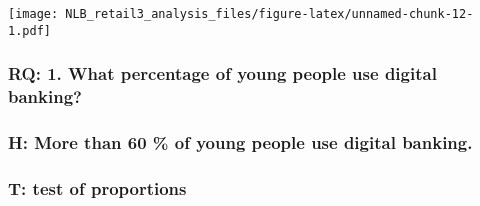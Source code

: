 \documentclass[
]{article}
\newenvironment{Shaded}{\begin{snugshade}}{\end{snugshade}}
\newcommand{\CommentTok}[1]{\textcolor[rgb]{0.56,0.35,0.01}{\textit{#1}}}
\newcommand{\ControlFlowTok}[1]{\textcolor[rgb]{0.13,0.29,0.53}{\textbf{#1}}}
\newcommand{\DecValTok}[1]{\textcolor[rgb]{0.00,0.00,0.81}{#1}}
\newcommand{\FunctionTok}[1]{\textcolor[rgb]{0.00,0.00,0.00}{#1}}
\newcommand{\NormalTok}[1]{#1}
\newcommand{\OtherTok}[1]{\textcolor[rgb]{0.56,0.35,0.01}{#1}}
\newcommand{\SpecialCharTok}[1]{\textcolor[rgb]{0.00,0.00,0.00}{#1}}
\begin{document}
\texttt{[image: NLB\_retail3\_analysis\_files/figure-latex/unnamed-chunk-12-1.pdf]}

\hypertarget{rq-1.-what-percentage-of-young-people-use-digital-banking}{%
\subsubsection{RQ: 1. What percentage of young people use digital
banking?}\label{rq-1.-what-percentage-of-young-people-use-digital-banking}}

\hypertarget{h-more-than-60-of-young-people-use-digital-banking.}{%
\subsubsection{H: More than 60 \% of young people use digital
banking.}\label{h-more-than-60-of-young-people-use-digital-banking.}}

\hypertarget{t-test-of-proportions}{%
\subsubsection{T: test of proportions}\label{t-test-of-proportions}}

\begin{Shaded}
\end{Shaded}
\end{document}

